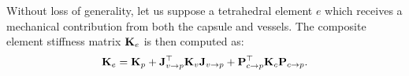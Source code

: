 Without loss of generality, let us suppose a tetrahedral element $e$ 
which receives a mechanical contribution from both the capsule and vessels. The composite element stiffness matrix $\mathbf{K}_e$
is then computed as:
\begin{equation}
\mathbf{K}_e = \mathbf{K}_p + \mathbf{J}_{v\rightarrow p}^\top \mathbf{K}_v \mathbf{J}_{v\rightarrow p} + \mathbf{P}_{c\rightarrow p}^\top \mathbf{K}_c \mathbf{P}_{c\rightarrow p}.
\end{equation}


% 
% 



